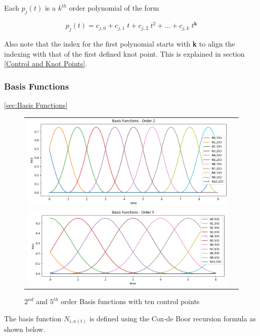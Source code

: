 \documentclass{article}
\begin{document}
Each \(p_j(t)\) is a \(k^{th}\) order polynomial of the form

\begin{equation}
    p_j(t) = c_{j,0} + c_{j,1} \; t + c_{j,2} \; t^{2} + ... + c_{j,k} \; t^{\textbf{k}}
\end{equation}

Also note that the index for the first polynomial starts with \textbf{k} to align the indexing with that of the first defined knot point. This is explained in section \ref{Control and Knot Points}.

\subsubsection{Basis Functions} \ref{sec:Basis Functions} \label{sec:Basis Functions}

 \begin{figure}[H]
\begin{tabular}{ll}
\includegraphics[scale=.422]{BasisFunctionsOrder2.png}
\\
\includegraphics[scale=.42]{BasisFunctionsOrder5.png}
\end{tabular}
\caption{$2^{nd}$ and $5^{th}$ order Basis functions with ten control points}
\label{Fig:Open Basis Functions}
\end{figure}

  The basis function \(N_{i,\kappa(t)}\) is defined using the Cox-de Boor recursion formula as shown below.
  
\end{document}
